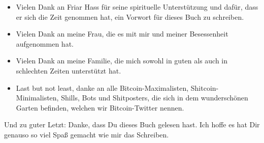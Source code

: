\begin{itemize}
  \item Vielen Dank an Friar Hass für seine spirituelle Unterstützung und dafür, dass er sich die Zeit genommen hat, ein Vorwort für dieses Buch zu schreiben.
  \item Vielen Dank an meine Frau, die es mit mir und meiner Besessenheit aufgenommen hat.
  \item Vielen Dank an meine Familie, die mich sowohl in guten als auch in schlechten Zeiten unterstützt hat.
  \item Last but not least, danke an alle Bitcoin-Maximalisten, Shitcoin-Minimalisten, Shills, Bots und Shitposters, die sich in dem wunderschönen Garten befinden, welchen wir Bitcoin-Twitter nennen.
\end{itemize}

Und zu guter Letzt: Danke, dass Du dieses Buch gelesen hast. Ich hoffe es hat Dir genauso so viel Spaß gemacht wie mir das Schreiben.
